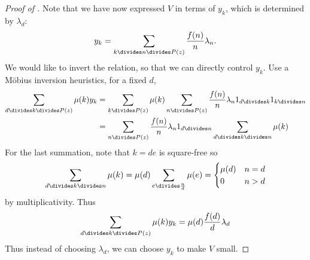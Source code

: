 \documentclass[a4paper]{article}
\theoremstyle{definition}
\begin{document}
\begin{proof}[Proof of ]
  Note that we have now expressed \(V\) in terms of \(y_k\), which is determined by \(\lambda_d\):
  \[
    y_k = \sum_{k \divides n \divides P(z)} \frac{f(n)}{n} \lambda_n.
  \]
  We would like to invert the relation, so that we can directly control \(y_k\). Use a Möbius inversion heuristics, for a fixed \(d\),
  \begin{align*}
    \sum_{d \divides k \divides P(z)} \mu(k) y_k
    &= \sum_{k \divides P(z)} \mu(k) \sum_{n \divides P(z)} \frac{f(n)}{n} \lambda_n 1_{d \divides k} 1_{k \divides n} \\
    &= \sum_{n \divides P(z)} \frac{f(n)}{n} \lambda_n 1_{d \divides n} \sum_{d \divides k \divides n} \mu(k)
  \end{align*}
  For the last summation, note that \(k = de\) is square-free so
  \[
    \sum_{d \divides k \divides n} \mu(k)
    = \mu(d) \sum_{e \divides \frac{n}{d}} \mu(e)
    =
    \begin{cases}
      \mu(d) & n = d \\
      0 & n > d
    \end{cases}
  \]
  by multiplicativity. Thus
  \[
    \sum_{d \divides k \divides P(z)} \mu(k) y_k
    = \mu(d) \frac{f(d)}{d} \lambda_d
  \]
  Thus instead of choosing \(\lambda_d\), we can choose \(y_k\) to make \(V\) small.


\end{proof}
\end{document}
